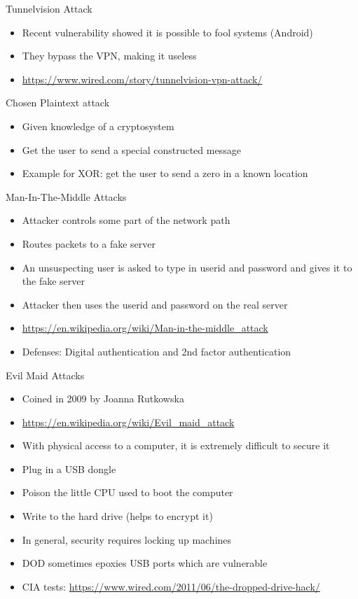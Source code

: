 \begin{withoutheadline}
\begin{frame}{Tunnelvision Attack}
\begin{itemize}
    \item Recent vulnerability showed it is possible to fool systems (Android)
    \item They bypass the VPN, making it useless
    \item \url{https://www.wired.com/story/tunnelvision-vpn-attack/}
\end{itemize}
\end{frame}

\begin{frame}{Chosen Plaintext attack}
\begin{itemize}
    \item Given knowledge of a cryptosystem
    \item Get the user to send a special constructed message
    \item Example for XOR: get the user to send a zero in a known location
\end{itemize}
\end{frame}

\begin{frame}{Man-In-The-Middle Attacks}
\begin{itemize}
    \item Attacker controls some part of the network path
    \item Routes packets to a fake server
    \item An unsuspecting user is asked to type in userid and password and gives it to the fake server
    \item Attacker then uses the userid and password on the real server
    \item \url{https://en.wikipedia.org/wiki/Man-in-the-middle_attack}
    \item Defenses: Digital authentication and 2nd factor authentication
\end{itemize}
\end{frame}

\begin{frame}{Evil Maid Attacks}
\begin{itemize}
    \item Coined in 2009 by Joanna Rutkowska
    \item \url{https://en.wikipedia.org/wiki/Evil_maid_attack}
    \item With physical access to a computer, it is extremely difficult to secure it
    \item Plug in a USB dongle
    \item Poison the little CPU used to boot the computer
    \item Write to the hard drive (helps to encrypt it)
    \item In general, security requires locking up machines
    \item DOD sometimes epoxies USB ports which are vulnerable
    \item CIA tests: \url{https://www.wired.com/2011/06/the-dropped-drive-hack/}
\end{itemize}
\end{frame}


\end{withoutheadline}
